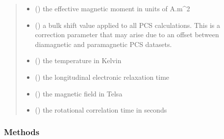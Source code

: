 \documentclass[a4paper,10pt,english]{sphinxmanual}
\begin{document}
\begin{fulllineitems}
\begin{fulllineitems}
\begin{quote}
\begin{description}
\begin{itemize}
\item {} 
 () \textendash{} the effective magnetic moment in units of A.m\textasciicircum{}2

\item {} 
 () \textendash{} a bulk shift value applied to all PCS calculations.
This is a correction parameter that may arise due to an offset
between diamagnetic and paramagnetic PCS datasets.

\item {} 
 () \textendash{} the temperature in Kelvin

\item {} 
 () \textendash{} the longitudinal electronic relaxation time

\item {} 
 () \textendash{} the magnetic field in Telsa

\item {} 
 () \textendash{} the rotational correlation time in seconds

\end{itemize}

\end{description}\end{quote}
\subsubsection*{Methods}


\begin{savenotes}\sphinxatlongtablestart\begin{longtable}{}
\hline

\endfirsthead

%
{}\\
\hline

\endhead

\hline
{}\\
\endfoot


\end{longtable}
\end{savenotes}
\end{fulllineitems}
\end{fulllineitems}
\end{document}
